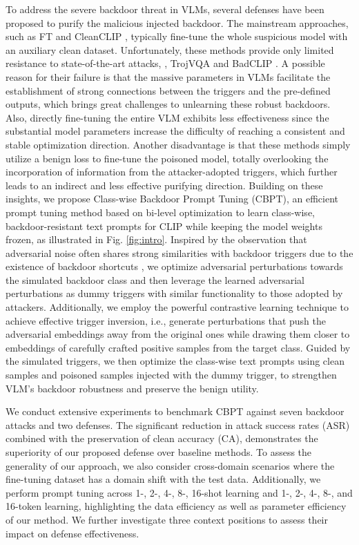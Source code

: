 To address the severe backdoor threat in VLMs, several defenses have been proposed to purify the malicious injected backdoor. The mainstream approaches, such as FT and CleanCLIP \cite{bansal2023cleanclip}, typically fine-tune the whole suspicious model with an auxiliary clean dataset. Unfortunately, these methods provide only limited resistance to state-of-the-art attacks, \eg, TrojVQA \cite{walmer2022dual} and BadCLIP \cite{liang2024badclip}. A possible reason for their failure is that the massive parameters in VLMs facilitate the establishment of strong connections between the triggers and the pre-defined outputs, which brings great challenges to unlearning these robust backdoors. Also, directly fine-tuning the entire VLM exhibits less effectiveness since the substantial model parameters increase the difficulty of reaching a consistent and stable optimization direction.
Another disadvantage is that these methods simply utilize a benign loss to fine-tune the poisoned model, totally overlooking the incorporation of information from the attacker-adopted triggers, which further leads to an indirect and less effective purifying direction.
Building on these insights, we propose Class-wise Backdoor Prompt Tuning (CBPT), an efficient prompt tuning method based on bi-level optimization to learn class-wise, backdoor-resistant text prompts for CLIP while keeping the model weights frozen, as illustrated in Fig. \ref{fig:intro}. Inspired by the observation that adversarial noise often shares strong similarities with backdoor triggers due to the existence of backdoor shortcuts \cite{wang2020practical, zhu2024neural}, we optimize adversarial perturbations towards the simulated backdoor class and then leverage the learned adversarial perturbations as dummy triggers with similar functionality to those adopted by attackers.   
Additionally, we employ the powerful contrastive learning technique to achieve effective trigger inversion, i.e., generate perturbations that push the adversarial embeddings away from the original ones while drawing them closer to embeddings of carefully crafted positive samples from the target class. Guided by the simulated triggers, we then optimize the class-wise text prompts using clean samples and poisoned samples injected with the dummy trigger, to strengthen VLM's backdoor robustness and preserve the benign utility. 

We conduct extensive experiments to benchmark CBPT against seven backdoor attacks and two defenses. The significant reduction in attack success rates (ASR) combined with the preservation of clean accuracy (CA), demonstrates the superiority of our proposed defense over baseline methods. To assess the generality of our approach, we also consider cross-domain scenarios where the fine-tuning dataset has a domain shift with the test data.
Additionally, we perform prompt tuning across 1-, 2-, 4-, 8-, 16-shot learning and 1-, 2-, 4-, 8-, and 16-token learning, highlighting the data efficiency as well as parameter efficiency of our method. We further investigate three context positions to assess their impact on defense effectiveness.

